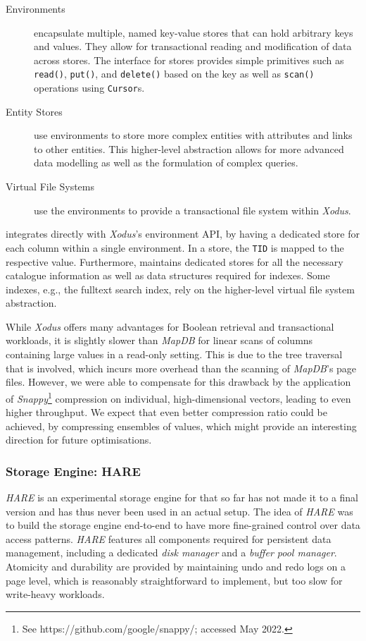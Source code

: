 \begin{description}
    \item [Environments] encapsulate multiple, named key-value stores that can hold arbitrary keys and values. They allow for transactional reading and modification of data across stores. The interface for stores provides simple primitives such as \texttt{read()}, \texttt{put()}, and \texttt{delete()} based on the key as well as \texttt{scan()} operations using \texttt{Cursor}s.
    \item [Entity Stores] use environments to store more complex entities with attributes and links to other entities. This higher-level abstraction allows for more advanced data modelling as well as the formulation of complex queries.
    \item [Virtual File Systems] use the environments to provide a transactional file system within \emph{Xodus}.
\end{description}

\cottontail{} integrates directly with \emph{Xodus}'s environment API, by having a dedicated store for each column within a single environment. In a store, the \texttt{TID} is mapped to the respective value. Furthermore, \cottontail{} maintains dedicated stores for all the necessary catalogue information as well as data structures required for indexes. Some indexes, e.g., the fulltext search index, rely on the higher-level virtual file system abstraction.

While \emph{Xodus} offers many advantages for Boolean retrieval and transactional workloads, it is slightly slower than \emph{MapDB} for linear scans of columns containing large values in a read-only setting. This is due to the tree traversal that is involved, which incurs more overhead than the scanning of \emph{MapDB}'s page files. However, we were able to compensate for this drawback by the application of \emph{Snappy}\footnote{See https://github.com/google/snappy/; accessed May 2022.} compression on individual, high-dimensional vectors, leading to even higher throughput. We expect that even better compression ratio could be achieved, by compressing ensembles of values, which might provide an interesting direction for future optimisations.

\subsubsection{Storage Engine: HARE}

\emph{HARE} is an experimental storage engine for \cottontail{} that so far has not made it to a final version and has thus never been used in an actual setup. The idea of \emph{HARE} was to build the storage engine end-to-end to have more fine-grained control over data access patterns. \emph{HARE} features all components required for persistent data management, including a dedicated \emph{disk manager} and a \emph{buffer pool manager}. Atomicity and durability are provided by maintaining undo and redo logs on a page level, which is reasonably straightforward to implement, but too slow for write-heavy workloads.

